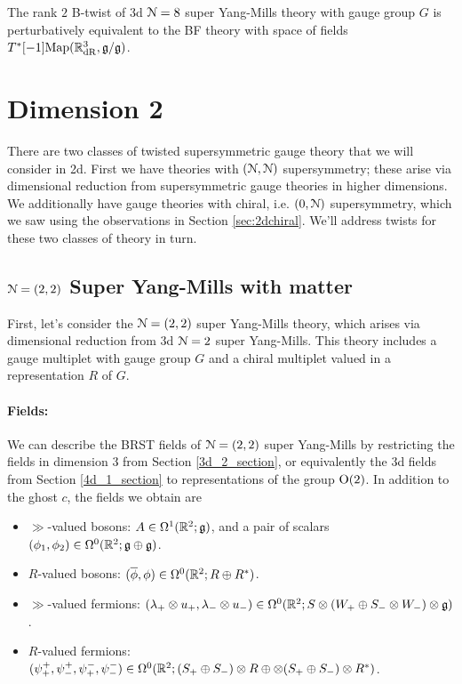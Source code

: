 \documentclass[10pt, oneside]{article}
\begin{document}
\begin{theorem} 
The rank $2$ B-twist of 3d $\mathcal{N}=8$ super Yang-Mills theory with gauge group $G$ is perturbatively equivalent to the BF theory with space of fields $T^*[-1]\mathrm{Map}(\mathbb R^3_{\mathrm{dR}}, \mathfrak{g}/\mathfrak{g})$. 
\end{theorem}

\section{Dimension 2}

There are two classes of twisted supersymmetric gauge theory that we will consider in 2d.  First we have theories with $(\mathcal{N}, \mathcal{N})$ supersymmetry; these arise via dimensional reduction from supersymmetric gauge theories in higher dimensions.  We additionally have gauge theories with chiral, i.e. $(0,\mathcal{N})$ supersymmetry, which we saw using the observations in Section \ref{sec:2dchiral}.  We'll address twists for these two classes of theory in turn.

\subsection{\texorpdfstring{$\mathcal N=(2,2)$}{N=(2,2)} Super Yang-Mills with matter} \label{sec:2d(2,2)}
First, let's consider the $\mathcal{N}=(2,2)$ super Yang-Mills theory, which arises via dimensional reduction from 3d $\mathcal{N}=2$ super Yang-Mills.  This theory includes a gauge multiplet with gauge group $G$ and a chiral multiplet valued in a representation $R$ of $G$.

\vspace{-10pt}
\paragraph{Fields:} We can describe the BRST fields of $\mathcal{N}=(2,2)$ super Yang-Mills by restricting the fields in dimension 3 from Section \ref{3d_2_section}, or equivalently the 3d fields from Section \ref{4d_1_section} to representations of the group $\mathrm{O}(2)$.  In addition to the ghost $c$, the fields we obtain are
\begin{itemize}
 \item $\gg$-valued bosons: $A \in \Omega^1(\mathbb R^2; \mathfrak{g})$, and a pair of scalars $(\phi_1,\phi_2) \in \Omega^0(\mathbb R^2; \mathfrak{g} \oplus \mathfrak{g})$.
 \item $R$-valued bosons: $(\overline{\phi}, \phi) \in \Omega^0(\mathbb R^2 ; R \oplus R^*)$.
 \item $\gg$-valued fermions: $(\lambda_+ \otimes u_+,\lambda_- \otimes u_-) \in \Omega^0(\mathbb R^2 ; S \otimes (W_+ \oplus S_- \otimes W_-) \otimes \mathfrak{g})$.
 \item $R$-valued fermions: $(\psi^+_+,\psi^+_-, \psi^-_+, \psi^-_-) \in \Omega^0(\mathbb R^2 ; (S_+ \oplus S_-) \otimes R \oplus \otimes (S_+ \oplus S_-) \otimes R^*)$.
\end{itemize}
\end{document}
